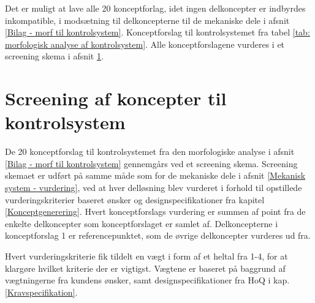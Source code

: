 Det er muligt at lave alle 20 konceptforlag, idet ingen delkoncepter er indbyrdes inkompatible, i modsætning til delkoncepterne til de mekaniske dele i afsnit \ref{Bilag - morf til kontrolsystem}. Konceptforslag til kontrolsystemet fra tabel \ref{tab: morfologisk analyse af kontrolsystem}. Alle konceptforslagene vurderes i et screening skema i afsnit \ref{Kontrolsystem - vurdering}.




\section{Screening af koncepter til kontrolsystem} \label{Kontrolsystem - vurdering}
De 20 konceptforslag til kontrolsystemet fra den morfologiske analyse i afsnit \ref{Bilag - morf til kontrolsystem} gennemgårs ved et screening skema. Screening skemaet er udført på samme måde som for de mekaniske dele i afsnit \ref{Mekanisk system - vurdering}, ved at hver delløsning blev vurderet i forhold til opstillede vurderingskriterier baseret ønsker og designspecifikationer fra kapitel \ref{Konceptgenerering}. Hvert konceptforslags vurdering er summen af point fra de enkelte delkoncepter som konceptforslaget er samlet af. Delkoncepterne i konceptforslag 1 er referencepunktet, som de øvrige delkoncepter vurderes ud fra. 

Hvert vurderingskriterie fik tildelt en vægt i form af et heltal fra 1-4, for at klargøre hvilket kriterie der er vigtigst. Vægtene er baseret på baggrund af vægtningerne fra kundens ønsker, samt designspecifikationer fra HoQ i kap. \ref{Kravspecifikation}.


